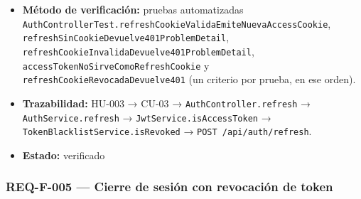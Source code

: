 \documentclass[
  spanish,
]{article}
\providecommand{\tightlist}{%
  \setlength{\itemsep}{0pt}\setlength{\parskip}{0pt}}
\begin{document}
\begin{itemize}
  \begin{enumerate}
  \def\labelenumi{\arabic{enumi}.}
  \tightlist
  \item
    Dada una cookie \texttt{refresh\_\allowbreak{}token} válida y no revocada, cuando
    se envía \texttt{POST\ /\allowbreak{}api/\allowbreak{}auth/\allowbreak{}refresh}, entonces la respuesta es
    \texttt{200\ OK} y se emite una nueva cookie \texttt{access\_\allowbreak{}token}.
  \item
    Dada la ausencia de cookie de refresh, entonces la respuesta es
    \texttt{401} con \texttt{Problem\allowbreak{}Detail}.
  \item
    Dada una cookie de refresh inválida o manipulada, entonces la
    respuesta es \texttt{401} con \texttt{Problem\allowbreak{}Detail}.
  \item
    Un access token presentado como refresh token no sirve para renovar:
    la respuesta es \texttt{401}.
  \item
    Un refresh token previamente revocado por logout devuelve
    \texttt{401}.
  \end{enumerate}
\item
  \textbf{Método de verificación:} pruebas automatizadas
  \texttt{Auth\allowbreak{}Controller\allowbreak{}Test.\allowbreak{}refresh\allowbreak{}Cookie\allowbreak{}Valida\allowbreak{}Emite\allowbreak{}Nueva\allowbreak{}Access\allowbreak{}Cookie},
  \texttt{refresh\allowbreak{}Sin\allowbreak{}Cookie\allowbreak{}Devuelve401\allowbreak{}Problem\allowbreak{}Detail},
  \texttt{refresh\allowbreak{}Cookie\allowbreak{}Invalida\allowbreak{}Devuelve401\allowbreak{}Problem\allowbreak{}Detail},
  \texttt{access\allowbreak{}Token\allowbreak{}No\allowbreak{}Sirve\allowbreak{}Como\allowbreak{}Refresh\allowbreak{}Cookie} y
  \texttt{refresh\allowbreak{}Cookie\allowbreak{}Revocada\allowbreak{}Devuelve401} (un criterio por prueba, en
  ese orden).
\item
  \textbf{Trazabilidad:} HU-003 → CU-03 →
  \texttt{Auth\allowbreak{}Controller.\allowbreak{}refresh} → \texttt{Auth\allowbreak{}Service.\allowbreak{}refresh} →
  \texttt{Jwt\allowbreak{}Service.\allowbreak{}is\allowbreak{}Access\allowbreak{}Token} →
  \texttt{Token\allowbreak{}Blacklist\allowbreak{}Service.\allowbreak{}is\allowbreak{}Revoked} →
  \texttt{POST\ /\allowbreak{}api/\allowbreak{}auth/\allowbreak{}refresh}.
\item
  \textbf{Estado:} verificado
\end{itemize}

\subsubsection{REQ-F-005 --- Cierre de sesión con revocación de
token}\label{req-f-005-cierre-de-sesiuxf3n-con-revocaciuxf3n-de-token}
\end{document}

